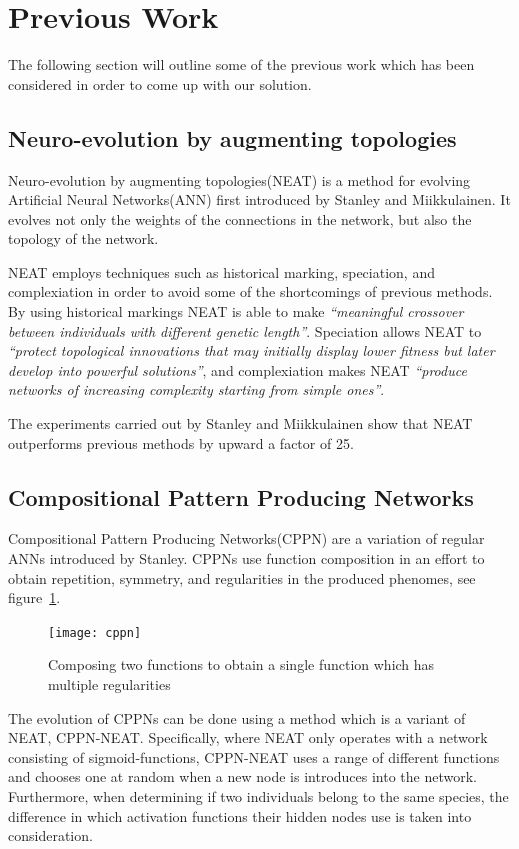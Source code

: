 \section{Previous Work}
The following section will outline some of the previous work which has been 
considered in order to come up with our solution.

\subsection{Neuro-evolution by augmenting topologies}
Neuro-evolution by augmenting topologies(NEAT) is a method for evolving 
Artificial Neural Networks(ANN) first introduced by Stanley and 
Miikkulainen\cite{stanley2002evolving}.
It evolves not only the weights of the connections in the network, but also the 
topology of the network.

NEAT employs techniques such as historical marking, speciation, and 
complexiation in order to avoid some of the shortcomings of previous methods.
By using historical markings NEAT is able to make \emph{``meaningful crossover 
between individuals with different
genetic length''}\cite[p.~50]{Floreano2008}.
Speciation allows NEAT to \emph{``protect topological innovations
that may initially display lower fitness but later
develop into powerful solutions''}\cite[p.~50]{Floreano2008}, and complexiation 
makes NEAT \emph{``produce networks of increasing complexity
starting from simple ones''}\cite[p.~50]{Floreano2008}.

The experiments carried out by Stanley and Miikkulainen show that NEAT 
outperforms previous methods by upward a factor of 
25\cite[p.~2]{stanley2002evolving}.
\subsection{Compositional Pattern Producing Networks}
\label{sec:cppn}
Compositional Pattern Producing Networks(CPPN) are a variation of regular ANNs 
introduced by 
Stanley\cite{Stanley2007}.
CPPNs use function composition in an effort to obtain repetition, symmetry, and 
regularities in the produced phenomes, see figure~\ref{fig:cppn}.
\begin{figure}[ht]
\centering
\texttt{[image: cppn]}
\caption{Composing two functions to obtain a single function which has multiple 
regularities \cite{Stanley2007}}
\label{fig:cppn}
\end{figure}

The evolution of CPPNs can be done using a method which is a variant of NEAT, 
CPPN-NEAT.
Specifically, where NEAT only operates with a network consisting of 
sigmoid-functions, CPPN-NEAT uses a range of different functions and chooses 
one at random when a new node is introduces into the network.
Furthermore, when determining if two individuals belong to the same species, 
the difference in which activation functions their hidden nodes use is taken 
into consideration.

